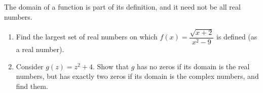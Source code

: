 The domain of a function is part of its definition, and it need not be all real numbers.
\begin{enumerate}
\item[(a)] Find the largest set of real numbers on which $f(x)=\dfrac{\sqrt{x+2}}{x^2-9}$ is defined (as a real number).
\item[(b)] Consider $g(z)=z^2+4$. Show that $g$ has no zeros if its domain is the real numbers, but has exactly two zeros if its domain is the complex numbers, and find them.
\end{enumerate}
